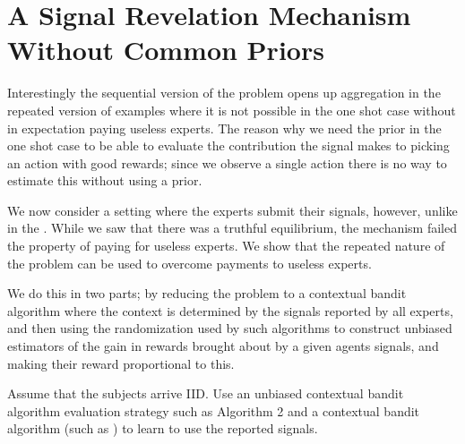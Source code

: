 



\section{A Signal Revelation Mechanism Without Common Priors}

Interestingly the sequential version of the problem opens up aggregation in the repeated version of examples where it is not possible in the one shot case without in expectation paying useless experts. 
The reason why we need the prior in the one shot case to be able to evaluate the contribution the signal makes to picking an action with good rewards; since we observe a single action there is no way to estimate this without using a prior. 

We now consider a setting where the experts submit their signals, however, unlike in the .
 While we saw that there was a truthful equilibrium, the mechanism failed the property of paying for useless experts. We show that the repeated nature of the problem can be used to overcome payments to useless experts. 

We do this in two parts; by reducing the problem to a contextual bandit algorithm where the context is determined by the signals reported by all experts, and then using the randomization used by such algorithms to construct unbiased estimators of the gain in rewards brought about by a given agents signals, and making their reward proportional to this.


Assume that the subjects arrive IID. Use an unbiased contextual bandit algorithm evaluation strategy such as \cite{li2011unbiased}  Algorithm 2 and a contextual bandit algorithm (such as \cite{syrgkanis2016efficient}) to learn to use the reported signals. %


